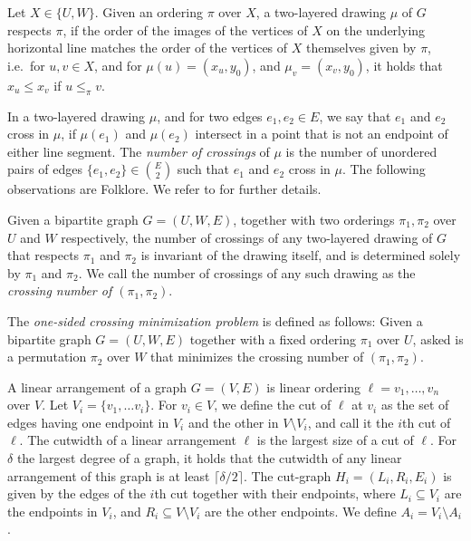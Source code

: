 \documentclass[a4paper,UKenglish,cleveref, autoref, thm-restate]{lipics-v2021}
\newcommand{\layerone}{\ensuremath{U}}
\newcommand{\layertwo}{\ensuremath{W}}
\begin{document}
Let $X\in \{\layerone, \layertwo\}$. Given an ordering $\pi$ over $X$, a two-layered drawing $\mu$ of $G$ respects $\pi$, if the order of the images of the vertices of $X$  on the underlying horizontal line matches the order of the vertices of $X$ themselves given by $\pi$, i.e.\ for $u,v \in X$, and for $\mu(u) = (x_u, y_0)$, and $\mu_v = (x_v, y_0)$, it holds that $x_u \leq x_v$ if $u\leq_{\pi} v$.

In a two-layered drawing $\mu$, and for two edges $e_1, e_2 \in E$, we say that $e_1$ and $e_2$ cross in $\mu$, if $\mu(e_1)$ and $\mu({e_2})$ intersect in a point that is not an endpoint of either line segment. The \emph{number of crossings} of $\mu$ is the number of unordered pairs of edges $\{e_1, e_2\}\in \binom{E}{2}$ such that $e_1$ and $e_2$ cross in $\mu$.
The following observations are Folklore. We refer to \cite{DBLP:journals/algorithmica/DujmovicW04} for further details.
\begin{lemma}
    Given a bipartite graph $G=(\layerone,\layertwo, E)$, together with two orderings $\pi_1, \pi_2$ over $\layerone$ and $\layertwo$ respectively, the number of crossings of any two-layered drawing  of $G$ that respects $\pi_1$ and $\pi_2$ is invariant of the drawing itself, and is determined solely by $\pi_1$ and $\pi_2$.
    We call the number of crossings of any such drawing as the \emph{crossing number of $(\pi_1, \pi_2)$}.
\end{lemma}

\begin{definition}
    The \emph{one-sided crossing minimization problem} is defined as follows: Given a bipartite graph $G = (\layerone,\layertwo,E)$ together with a fixed ordering $\pi_1$ over $\layerone$, asked is a permutation $\pi_2$ over $\layertwo$ that minimizes the crossing number of $(\pi_1, \pi_2)$.
\end{definition}

A linear arrangement of a graph $G=(V,E)$ is linear ordering $\ell = v_1, \dots, v_n$ over $V$. Let $V_i = \{v_1,\dots v_i\}$. For $v_i \in V$, we define the cut of $\ell$ at $v_i$ as the set of edges having one endpoint in $V_i$ and the other in $V\setminus V_i$, and call it the $i$th cut of $\ell$.
The cutwidth of a linear arrangement $\ell$ is the largest size of a cut of $\ell$. For $\delta$ the largest degree of a graph, it holds that the cutwidth of any linear arrangement of this graph is at least $\lceil\delta/2\rceil$.
The cut-graph $H_i = (L_i,R_i, E_i)$ is given by the edges of the $i$th cut together with their endpoints, where $L_i\subseteq V_i$ are the endpoints in $V_i$, and $R_i \subseteq V\setminus V_i$ are the other endpoints. We define $A_i = V_i\setminus A_i$.
\end{document}
